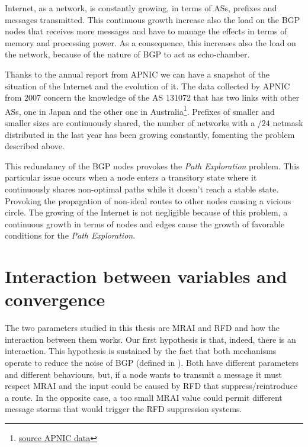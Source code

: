Internet, as a network, is constantly growing, in terms of \acp{AS}, prefixes
and messages transmitted.
This continuous growth increase also the load on the \ac{BGP} nodes that
receives more messages and have to manage the effects in terms of memory
and processing power.
As a consequence, this increases also the load on the network, because of the
nature of \ac{BGP} to act as echo-chamber.

Thanks to the annual report from \ac{APNIC} we can have a snapshot of
the situation of the Internet and the evolution of it.
The data collected by \ac{APNIC} from \num{2007} concern the knowledge
of the \ac{AS} 131072 that has two links with other \acp{AS}, one in Japan and
the other one in Australia\footnote{\href{https://blog.apnic.net/2021/01/05/bgp-in-2020-the-bgp-table/}{source APNIC data}}.
Prefixes of smaller and smaller sizes are continuously shared, the number of
networks with a $/24$ netmask distributed in the last year has been growing constantly,
fomenting the problem described above.

This redundancy of the \ac{BGP} nodes provokes the \textit{Path Exploration}
problem.
This particular issue occurs when a node enters a transitory state where it
continuously shares non-optimal paths while it doesn't reach a stable state.
Provoking the propagation of non-ideal routes to other nodes causing a vicious
circle.
The growing of the Internet is not negligible because of this problem, a continuous
growth in terms of nodes and edges cause the growth of favorable conditions for
the \textit{Path Exploration}.

\section{Interaction between variables and convergence}
\label{sec:bgp_correlations}

The two parameters  studied in this thesis are \ac{MRAI} and \ac{RFD}
and how the interaction between them works.
Our first hypothesis is that, indeed, there is an interaction.
This hypothesis is sustained by the fact that both mechanisms operate to
reduce the noise of \ac{BGP} (defined in ).
Both have different parameters and different behaviours,
but, if a node wants to transmit a message it must respect \ac{MRAI} and the input
could be caused by \ac{RFD} that suppress/reintroduce a route.
In the opposite case, a too small \ac{MRAI} value could permit different message
storms that would trigger the \ac{RFD} suppression systems.


